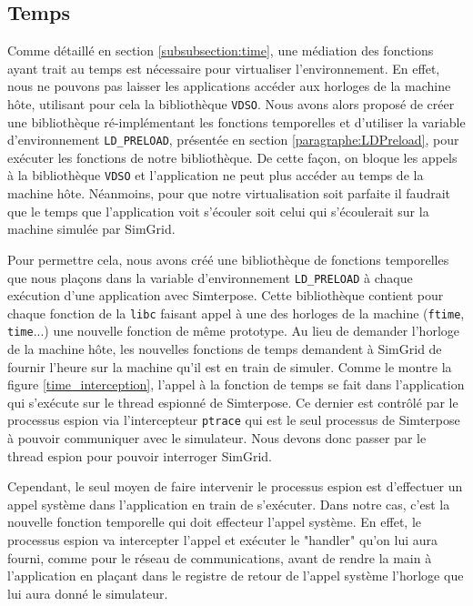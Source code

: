 \subsection{Temps}
\label{section:work:time}

Comme détaillé en section \ref{subsubsection:time}, une médiation des fonctions ayant trait au temps est nécessaire pour virtualiser l'environnement. En effet, nous ne pouvons pas laisser les applications accéder aux horloges de la machine hôte, utilisant pour cela la bibliothèque \texttt{VDSO}. Nous avons alors proposé de créer une bibliothèque ré-implémentant les fonctions temporelles et d'utiliser la variable d'environnement \texttt{LD\_PRELOAD}, présentée en section \ref{paragraphe:LDPreload}, pour exécuter les fonctions de notre bibliothèque. De cette façon, on bloque les appels à la bibliothèque \texttt{VDSO} et l'application ne peut plus accéder au temps de la machine hôte. Néanmoins, pour que notre virtualisation soit parfaite il faudrait que le temps que l'application voit s'écouler soit celui qui s'écoulerait sur la machine simulée par SimGrid. 

Pour permettre cela, nous avons créé une bibliothèque de fonctions temporelles que nous plaçons dans la variable d'environnement \texttt{LD\_PRELOAD} à chaque exécution d'une application avec Simterpose. Cette bibliothèque contient pour chaque fonction de la \texttt{libc} faisant appel à une des horloges de la machine (\texttt{ftime}, \texttt{time}...) une nouvelle fonction de même prototype. Au lieu de demander l'horloge de la machine hôte, les nouvelles fonctions de temps demandent à SimGrid de fournir l'heure sur la machine qu'il est en train de simuler. Comme le montre la figure \ref{time_interception}, l'appel à la fonction de temps se fait dans l'application qui s'exécute sur le thread espionné de Simterpose. Ce dernier est contrôlé par le processus espion via l'intercepteur \texttt{ptrace} qui est le seul processus de Simterpose à pouvoir communiquer avec le simulateur. Nous devons donc passer par le thread espion pour pouvoir interroger SimGrid. 

Cependant, le seul moyen de faire intervenir le processus espion est d'effectuer un appel système dans l'application en train de s'exécuter. Dans notre cas, c'est la nouvelle fonction temporelle qui doit effecteur l'appel système. En effet, le processus espion va intercepter l'appel et exécuter le "handler" qu'on lui aura fourni, comme pour le réseau de communications, avant de rendre la main à l'application en plaçant dans le registre de retour de l'appel système l'horloge que lui aura donné le simulateur.

